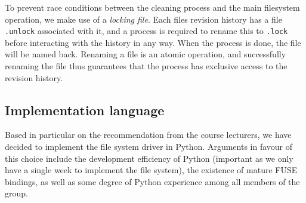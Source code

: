 \documentclass[12pt]{article}
\begin{document}
To prevent race conditions between the cleaning process and the main
filesystem operation, we make use of a \textit{locking file}.  Each
files revision history has a file \texttt{.unlock} associated with it,
and a process is required to rename this to \texttt{.lock} before
interacting with the history in any way.  When the process is done,
the file will be named back.  Renaming a file is an atomic operation,
and successfully renaming the file thus guarantees that the process
has exclusive access to the revision history.\cite{Santry:1999gf}

\subsection{Implementation language}

Based in particular on the recommendation from the course lecturers,
we have decided to implement the file system driver in Python.
Arguments in favour of this choice include the development efficiency
of Python (important as we only have a single week to implement the
file system), the existence of mature FUSE bindings, as well as some
degree of Python experience among all members of the group.



 
\end{document}
